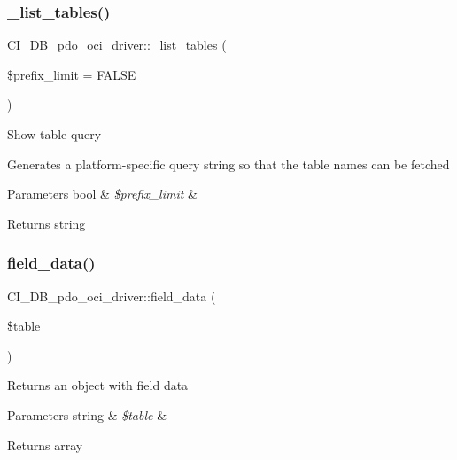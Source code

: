 \subsubsection{\texorpdfstring{\+\_\+list\+\_\+tables()}{\_list\_tables()}}
{\footnotesize\ttfamily C\+I\+\_\+\+D\+B\+\_\+pdo\+\_\+oci\+\_\+driver\+::\+\_\+list\+\_\+tables (\begin{DoxyParamCaption}\item[{}]{\$prefix\+\_\+limit = {\ttfamily FALSE} }\end{DoxyParamCaption})\hspace{0.3cm}{\ttfamily [protected]}}

Show table query

Generates a platform-\/specific query string so that the table names can be fetched


\begin{DoxyParams}[1]{Parameters}
bool & {\em \$prefix\+\_\+limit} & \\
\hline
\end{DoxyParams}
\begin{DoxyReturn}{Returns}
string 
\end{DoxyReturn}
\mbox{\label{class_c_i___d_b__pdo__oci__driver_a798288c521e1518fdf7d766b6b31aeff}} 
\subsubsection{\texorpdfstring{field\+\_\+data()}{field\_data()}}
{\footnotesize\ttfamily C\+I\+\_\+\+D\+B\+\_\+pdo\+\_\+oci\+\_\+driver\+::field\+\_\+data (\begin{DoxyParamCaption}\item[{}]{\$table }\end{DoxyParamCaption})}

Returns an object with field data


\begin{DoxyParams}[1]{Parameters}
string & {\em \$table} & \\
\hline
\end{DoxyParams}
\begin{DoxyReturn}{Returns}
array 
\end{DoxyReturn}
\mbox{\label{class_c_i___d_b__pdo__oci__driver_a31488815a38e81451a53c670ebd6679d}} 
